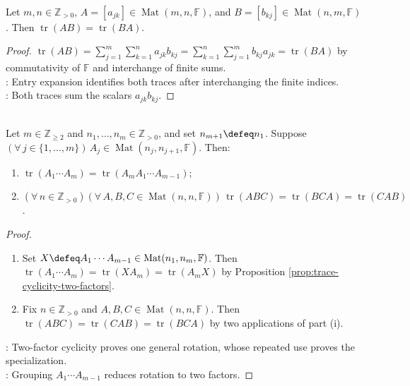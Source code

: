 \begin{proposition} \label{prop:trace-cyclicity-two-factors} \\
Let $m,n\in\mathbb{Z}_{>0}$, $A=[a_{jk}]\in\operatorname{Mat}(m,n,\mathbb{F})$, and $B=[b_{kj}]\in\operatorname{Mat}(n,m,\mathbb{F})$. Then $\operatorname{tr}(AB)=\operatorname{tr}(BA)$.
\begin{proof}
$\operatorname{tr}(AB)=\sum\limits_{j=1}^{m}\sum\limits_{k=1}^{n}a_{jk}b_{kj}=\sum\limits_{k=1}^{n}\sum\limits_{j=1}^{m}b_{kj}a_{jk}=\operatorname{tr}(BA)$ by commutativity of $\mathbb{F}$ and interchange of finite sums.\\
: Entry expansion identifies both traces after interchanging the finite indices.\\
: Both traces sum the scalars $a_{jk}b_{kj}$.
\end{proof}
\end{proposition}

\begin{proposition} \label{prop:trace-cyclic-products} \\
Let $m\in\mathbb{Z}_{\geq2}$ and $n_1,\ldots,n_m\in\mathbb{Z}_{>0}$, and set $n_{m+1}\defeq n_1$. Suppose $(\forall\,j\in\{1,\ldots,m\})\,A_j\in\operatorname{Mat}(n_j,n_{j+1},\mathbb{F})$. Then:
\begin{enumerate}[label=(\roman*)]
\setlength{\itemsep}{0pt}
\item $\operatorname{tr}(A_1\cdots A_m)=\operatorname{tr}(A_mA_1\cdots A_{m-1})$;
\item $(\forall\,n\in\mathbb{Z}_{>0})(\forall\,A,B,C\in\operatorname{Mat}(n,n,\mathbb{F}))\,\operatorname{tr}(ABC)=\operatorname{tr}(BCA)=\operatorname{tr}(CAB)$.
\end{enumerate}
\begin{proof}
\begin{enumerate}[label=(\roman*)]
\setlength{\itemsep}{0pt}
\item Set $X\defeq A_1\cdots A_{m-1}\in\operatorname{Mat}(n_1,n_m,\mathbb{F})$. Then $\operatorname{tr}(A_1\cdots A_m)=\operatorname{tr}(XA_m)=\operatorname{tr}(A_mX)$ by Proposition \ref{prop:trace-cyclicity-two-factors}.
\item Fix $n\in\mathbb{Z}_{>0}$ and $A,B,C\in\operatorname{Mat}(n,n,\mathbb{F})$. Then $\operatorname{tr}(ABC)=\operatorname{tr}(CAB)=\operatorname{tr}(BCA)$ by two applications of part (i).
\end{enumerate}
: Two-factor cyclicity proves one general rotation, whose repeated use proves the specialization.\\
: Grouping $A_1\cdots A_{m-1}$ reduces rotation to two factors.
\end{proof}
\end{proposition}

